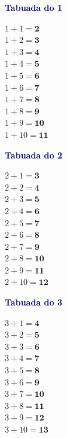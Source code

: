 \documentclass[12pt]{article}
\begin{document}
\vspace{4pt}


\noindent
\begin{minipage}[t]{3.3cm}
\noindent\textcolor{darkblue}{\bfseries\small Tabuada do 1}\par\vspace{2pt}
{\footnotesize
$1{+}1=\mathbf{2}$\\$1{+}2=\mathbf{3}$\\$1{+}3=\mathbf{4}$\\
$1{+}4=\mathbf{5}$\\$1{+}5=\mathbf{6}$\\$1{+}6=\mathbf{7}$\\
$1{+}7=\mathbf{8}$\\$1{+}8=\mathbf{9}$\\$1{+}9=\mathbf{10}$\\
$1{+}10=\mathbf{11}$}
\end{minipage}\hfill
\begin{minipage}[t]{3.3cm}
\noindent\textcolor{darkblue}{\bfseries\small Tabuada do 2}\par\vspace{2pt}
{\footnotesize
$2{+}1=\mathbf{3}$\\$2{+}2=\mathbf{4}$\\$2{+}3=\mathbf{5}$\\
$2{+}4=\mathbf{6}$\\$2{+}5=\mathbf{7}$\\$2{+}6=\mathbf{8}$\\
$2{+}7=\mathbf{9}$\\$2{+}8=\mathbf{10}$\\$2{+}9=\mathbf{11}$\\
$2{+}10=\mathbf{12}$}
\end{minipage}\hfill
\begin{minipage}[t]{3.3cm}
\noindent\textcolor{darkblue}{\bfseries\small Tabuada do 3}\par\vspace{2pt}
{\footnotesize
$3{+}1=\mathbf{4}$\\$3{+}2=\mathbf{5}$\\$3{+}3=\mathbf{6}$\\
$3{+}4=\mathbf{7}$\\$3{+}5=\mathbf{8}$\\$3{+}6=\mathbf{9}$\\
$3{+}7=\mathbf{10}$\\$3{+}8=\mathbf{11}$\\$3{+}9=\mathbf{12}$\\
$3{+}10=\mathbf{13}$}
\end{minipage}\hfill
\end{document}
